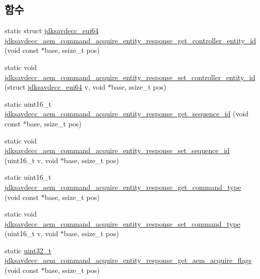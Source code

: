 \subsection*{함수}
\begin{DoxyCompactItemize}
\item 
static struct \hyperlink{structjdksavdecc__eui64}{jdksavdecc\+\_\+eui64} \hyperlink{group__command__acquire__entity__response_gac504ca038375677c111124c137be683e}{jdksavdecc\+\_\+aem\+\_\+command\+\_\+acquire\+\_\+entity\+\_\+response\+\_\+get\+\_\+controller\+\_\+entity\+\_\+id} (void const $\ast$base, ssize\+\_\+t pos)
\item 
static void \hyperlink{group__command__acquire__entity__response_ga6365d7a490014331d1681fc6c80a8a5b}{jdksavdecc\+\_\+aem\+\_\+command\+\_\+acquire\+\_\+entity\+\_\+response\+\_\+set\+\_\+controller\+\_\+entity\+\_\+id} (struct \hyperlink{structjdksavdecc__eui64}{jdksavdecc\+\_\+eui64} v, void $\ast$base, ssize\+\_\+t pos)
\item 
static uint16\+\_\+t \hyperlink{group__command__acquire__entity__response_ga9e6348a4971402af5ee9124a7f50605a}{jdksavdecc\+\_\+aem\+\_\+command\+\_\+acquire\+\_\+entity\+\_\+response\+\_\+get\+\_\+sequence\+\_\+id} (void const $\ast$base, ssize\+\_\+t pos)
\item 
static void \hyperlink{group__command__acquire__entity__response_ga54fce74a174080a9e83b082abe5dc7c4}{jdksavdecc\+\_\+aem\+\_\+command\+\_\+acquire\+\_\+entity\+\_\+response\+\_\+set\+\_\+sequence\+\_\+id} (uint16\+\_\+t v, void $\ast$base, ssize\+\_\+t pos)
\item 
static uint16\+\_\+t \hyperlink{group__command__acquire__entity__response_ga92945c4e84574321ff878336c2b36381}{jdksavdecc\+\_\+aem\+\_\+command\+\_\+acquire\+\_\+entity\+\_\+response\+\_\+get\+\_\+command\+\_\+type} (void const $\ast$base, ssize\+\_\+t pos)
\item 
static void \hyperlink{group__command__acquire__entity__response_ga3881cfccc35210cf93159d7e231f15cd}{jdksavdecc\+\_\+aem\+\_\+command\+\_\+acquire\+\_\+entity\+\_\+response\+\_\+set\+\_\+command\+\_\+type} (uint16\+\_\+t v, void $\ast$base, ssize\+\_\+t pos)
\item 
static \hyperlink{parse_8c_a6eb1e68cc391dd753bc8ce896dbb8315}{uint32\+\_\+t} \hyperlink{group__command__acquire__entity__response_ga0af0d5298c589d41119a4fa5971e5a00}{jdksavdecc\+\_\+aem\+\_\+command\+\_\+acquire\+\_\+entity\+\_\+response\+\_\+get\+\_\+aem\+\_\+acquire\+\_\+flags} (void const $\ast$base, ssize\+\_\+t pos)
\item 

\end{DoxyCompactItemize}
